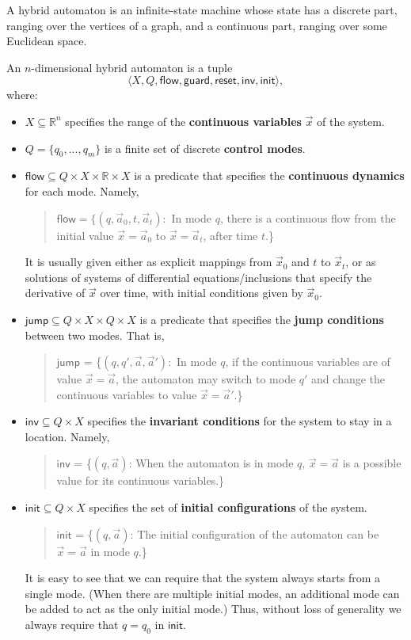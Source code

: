 \documentclass[envcountsect]{llncs}
\newcommand{\flow}{\mathsf{flow}}
\newcommand{\jump}{\mathsf{jump}}
\newcommand{\inv}{\mathsf{inv}}
\newcommand{\init}{\mathsf{init}}
\newcommand{\guard}{\mathsf{guard}}
\newcommand{\reset}{\mathsf{reset}}
\newcommand{\R}{\mathbb{R}}
\begin{document}
A hybrid automaton is an infinite-state machine whose state has a discrete part, ranging over the vertices of a graph, and a continuous part, ranging over some Euclidean space. 
\begin{definition}\label{auto-def}
An $n$-dimensional hybrid automaton is a tuple $$\langle X, Q, \flow, \guard, \reset, \inv, \init\rangle,$$ where:
\begin{itemize}
\item $X\subseteq \mathbb{R}^n$ specifies the range of the {\bf continuous variables} $\vec x$ of the system. 
\item $Q=\{q_0,...,q_m\}$ is a finite set of discrete {\bf control modes}. 
\item $\flow \subseteq Q\times X\times \R \times X$ is a predicate that specifies the {\bf continuous dynamics} for each mode. Namely, 
\begin{quote}
$\flow = \{(q, \vec a_0, t, \vec a_t):$ In mode $q$, there is a continuous flow from the initial value $\vec x = \vec a_0$ to $\vec x = \vec a_t$, after time $t$.\}
\end{quote}
It is usually given either as explicit mappings from $\vec x_0$ and $t$ to $\vec x_t$, or as solutions of systems of differential equations/inclusions that specify the derivative of $\vec x$ over time, with initial conditions given by $\vec x_0$. 

\item $\jump\subseteq Q\times X\times Q\times X$ is a predicate that specifies the {\bf jump conditions} between two modes. That is,  
\begin{quote}
$\jump$ = \{$(q,q',\vec a,\vec a'):$ In mode $q$, if the continuous variables are of value $\vec x = \vec a$, the automaton may switch to mode $q'$ and change the continuous variables to value $\vec x = \vec a'$.\}
\end{quote}

\item $\inv \subseteq Q\times X$ specifies the {\bf invariant conditions} for the system to stay in a location. Namely,
\begin{quote}
$\inv$ = \{$(q,\vec a)$: When the automaton is in mode $q$, $\vec x = \vec a$ is a possible value for its continuous variables.\}
\end{quote}

\item $\init \subseteq Q\times X$ specifies the set of {\bf initial configurations} of the system. 
\begin{quote}
$\init$ = \{$(q, \vec a)$: The initial configuration of the automaton can be $\vec x = \vec a$ in mode $q$.\}
\end{quote}
It is easy to see that we can require that the system always starts from a single mode. (When there are multiple initial modes, an additional mode can be added to act as the only initial mode.) Thus, without loss of generality we always require that $q=q_0$ in $\init$. 
\end{itemize}
\end{definition}
\end{document}
